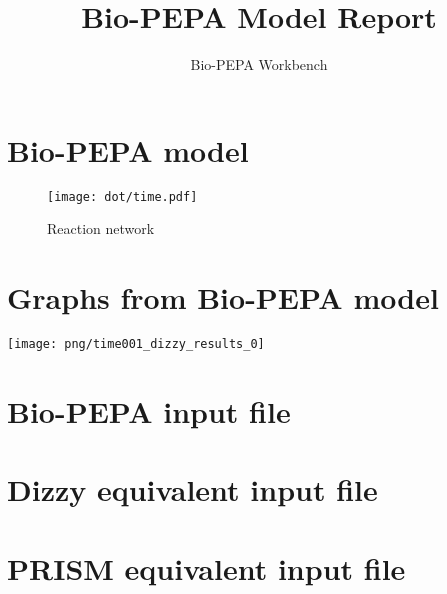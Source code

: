 \documentclass{llncs}
\title{Bio-PEPA Model Report}
\author{Bio-PEPA Workbench}
\institute{\today}
\begin{document}
\maketitle
\section{Bio-PEPA model}

\begin{figure}[htbp]
\begin{center}
\texttt{[image: dot/time.pdf]}
\caption{Reaction network}
\end{center}
\end{figure}
\newpage
\section{Graphs from Bio-PEPA model}
\texttt{[image: png/time001\_dizzy\_results\_0]}
\appendix
\newpage
\section{Bio-PEPA input file}

\newpage
\section{Dizzy equivalent input file}

\newpage
\section{PRISM equivalent input file}

\end{document}
